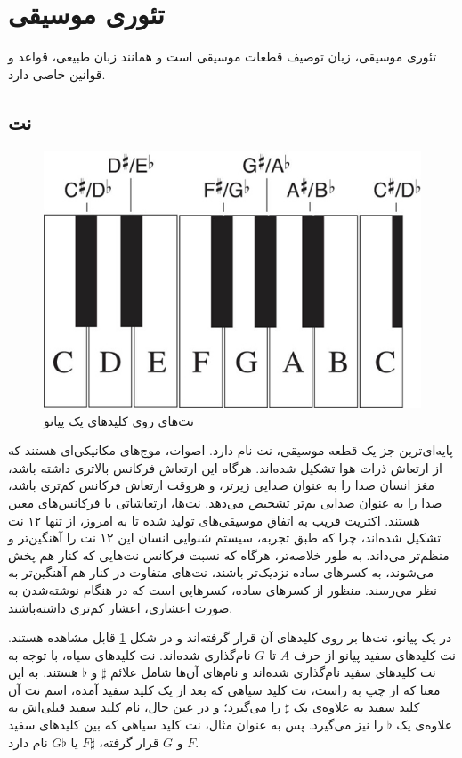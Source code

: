 \section{تئوری موسیقی}

تئوری موسیقی، زبان توصیف قطعات موسیقی است و همانند زبان طبیعی، قواعد و قوانین خاصی دارد.

\subsection{نت}

\begin{figure}
	\centering
	\includegraphics[scale=0.4]{figures/pianokeys.jpg}
	\caption {
	نت‌های روی کلیدهای یک پیانو
	}
	\label{fig:pianokeys}
\end{figure}


پایه‌ای‌ترین جز یک قطعه موسیقی، نت نام دارد. اصوات، موج‌های مکانیکی‌ای هستند که از ارتعاش ذرات هوا تشکیل شده‌اند. هرگاه این ارتعاش فرکانس بالاتری داشته باشد، مغز انسان صدا را به عنوان صدایی زیرتر، و هروقت ارتعاش فرکانس کم‌تری باشد، صدا را به عنوان صدایی بم‌تر تشخیص می‌دهد.
نت‌ها، ارتعاشاتی با فرکانس‌های معین هستند. اکثریت قریب به اتفاق موسیقی‌های تولید شده تا به امروز، از تنها ۱۲ نت تشکیل شده‌اند، چرا که طبق تجربه، سیستم شنوایی انسان این ۱۲ نت را آهنگین‌تر و منظم‌تر می‌داند.
به طور خلاصه‌تر،  هرگاه که نسبت فرکانس نت‌هایی که  کنار هم پخش می‌شوند، به کسرهای ساده نزدیک‌تر باشند، نت‌های متفاوت در کنار هم آهنگین‌تر به نظر می‌رسند. منظور از کسرهای ساده، کسرهایی است که در هنگام نوشته‌شدن به صورت اعشاری، اعشار کم‌تری داشته‌باشند.

در یک پیانو، نت‌ها بر روی کلیدهای آن قرار گرفته‌اند و در شکل
\ref{fig:pianokeys}
قابل مشاهده هستند.
نت کلیدهای سفید پیانو از حرف 
$A$
تا
$G$
نام‌گذاری شده‌اند. 
نت کلیدهای سیاه، با توجه به نت کلیدهای سفید نام‌گذاری شده‌اند و نام‌های آن‌ها شامل علائم
$\sharp$
و
$\flat$
هستند. 
به این معنا که از چپ به راست، نت کلید سیاهی که بعد از یک کلید سفید آمده، اسم نت آن کلید سفید به علاوه‌ی یک
$\sharp$
را می‌گیرد؛ و در عین حال، نام کلید سفید قبلی‌اش به علاوه‌ی یک
$\flat$
را نیز می‌گیرد. پس به عنوان مثال، نت کلید سیاهی که بین کلیدهای سفید 
$F$
و 
$G$
قرار گرفته، 
$F\sharp$
یا
$G\flat$
نام دارد.

